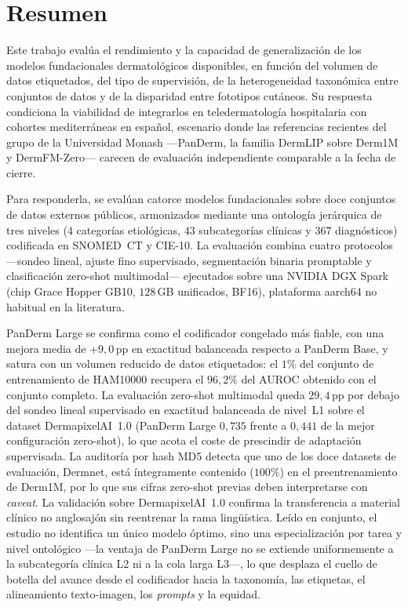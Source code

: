 
\chapter*{Resumen}
\vspace*{-1.5cm}

Este trabajo evalúa el rendimiento y la capacidad de generalización
de los modelos fundacionales dermatológicos disponibles, en función
del volumen de datos etiquetados, del tipo de supervisión, de la
heterogeneidad taxonómica entre conjuntos de datos y de la
disparidad entre fototipos cutáneos. Su respuesta condiciona la
viabilidad de integrarlos en teledermatología hospitalaria con
cohortes mediterráneas en español, escenario donde las referencias
recientes del grupo de la Universidad Monash ---PanDerm, la familia
DermLIP sobre Derm1M y DermFM-Zero--- carecen de evaluación
independiente comparable a la fecha de cierre.

Para responderla, se evalúan catorce modelos fundacionales sobre
doce conjuntos de datos externos públicos, armonizados mediante una
ontología jerárquica de tres niveles ($4$ categorías etiológicas,
$43$ subcategorías clínicas y $367$ diagnósticos) codificada en
SNOMED~CT y CIE-10. La evaluación combina cuatro protocolos
---sondeo lineal, ajuste fino supervisado, segmentación binaria
promptable y clasificación zero-shot multimodal--- ejecutados sobre
una NVIDIA DGX Spark (chip Grace Hopper GB10, $128$\,GB unificados,
BF16), plataforma aarch64 no habitual en la literatura.

PanDerm Large se confirma como el codificador congelado más fiable,
con una mejora media de $+9{,}0$\,pp en exactitud balanceada
respecto a PanDerm Base, y satura con un volumen reducido de datos
etiquetados: el $1\%$ del conjunto de entrenamiento de HAM10000
recupera el $96{,}2\%$ del AUROC obtenido con el conjunto completo.
La evaluación zero-shot multimodal queda $29{,}4$\,pp por debajo del
sondeo lineal supervisado en exactitud balanceada de nivel~L1 sobre
el dataset DermapixelAI~1.0 (PanDerm Large $0{,}735$ frente a
$0{,}441$ de la mejor configuración zero-shot), lo que acota el
coste de prescindir de adaptación supervisada. La auditoría por hash
MD5 detecta que uno de los doce datasets de evaluación, Dermnet,
está íntegramente contenido ($100\%$) en el preentrenamiento de
Derm1M, por lo que sus cifras zero-shot previas deben interpretarse
con \emph{caveat}. La validación sobre DermapixelAI~1.0 confirma la
transferencia a material clínico no anglosajón sin reentrenar la
rama lingüística. Leído en conjunto, el estudio no identifica un
único modelo óptimo, sino una especialización por tarea y nivel
ontológico ---la ventaja de PanDerm Large no se extiende
uniformemente a la subcategoría clínica L2 ni a la cola larga
L3---, lo que desplaza el cuello de botella del avance desde el
codificador hacia la taxonomía, las etiquetas, el alineamiento
texto-imagen, los \emph{prompts} y la equidad.

